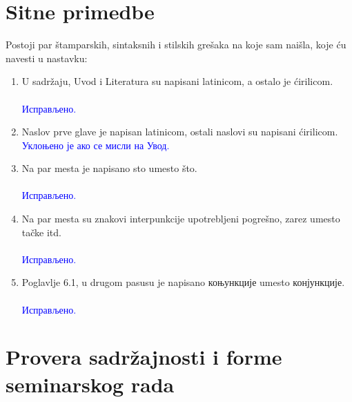 \documentclass[a4paper]{report}
\newcommand{\odgovor}[1]{\textcolor{blue}{#1}}
\begin{document}
\section{Sitne primedbe}
Postoji par štamparskih, sintaksnih i stilskih grešaka na koje sam naišla, koje ću navesti u nastavku:
\begin{enumerate}
\item U sadržaju, Uvod i Literatura su napisani latinicom, a ostalo je ćirilicom.
    \\\\
    \odgovor{Исправљено.} 
	\\
\item Naslov prve glave je napisan latinicom, ostali naslovi su napisani ćirilicom.
    \\
    \odgovor{Уклоњено је ако се мисли на Увод.} 
	\\
\item Na par mesta je napisano sto umesto što.
    \\\\
    \odgovor{Исправљено.} 
	\\
\item Na par mesta su znakovi interpunkcije upotrebljeni pogrešno, zarez umesto tačke itd.
    \\\\
    \odgovor{Исправљено.} 
	\\
\item Poglavlje 6.1, u drugom pasusu je napisano коњункције umesto конјункције.
    \\\\
    \odgovor{Исправљено.} 
	\\
\end{enumerate}

\section{Provera sadržajnosti i forme seminarskog rada}
\end{document}
